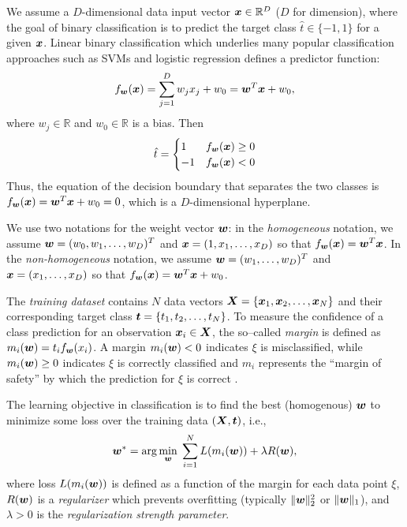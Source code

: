 \ENDMYCOMMENT

We assume a $D$-dimensional data input vector $\boldsymbol{x} \in \mathbb{R}^D$ ($D$ for
dimension), where the goal of binary classification is to predict the
target class $\hat{t} \in \{ -1, 1 \}$ for a given $\boldsymbol{x}$.  Linear
binary classification which underlies many popular classification
approaches such as SVMs and logistic regression defines a predictor
function:
\begin{equation} 
\label{eq:predictor}
f_{\boldsymbol{w}}(\boldsymbol{x}) = \sum_{j=1}^D w_j x_j + w_0 = \boldsymbol{w}^T \boldsymbol{x} + w_0,
\end{equation}
where $w_j \in \mathbb{R}$ and $w_0 \in \mathbb{R}$ is a bias.  Then
\begin{equation}
\hat{t} = 
  \begin{cases}
  1  & f_{\boldsymbol{w}}(\boldsymbol{x}) \geq 0\\
  -1 & f_{\boldsymbol{w}}(\boldsymbol{x}) <    0
  \end{cases}
\end{equation}
Thus, the equation of the decision boundary that separates the two
classes is $f_{\boldsymbol{w}}(\boldsymbol{x}) = \boldsymbol{w}^T \boldsymbol{x} + w_0 = 0$, which is a
$D$-dimensional hyperplane.

We use two notations for the weight vector $\boldsymbol{w}$: in the
\emph{homogeneous} notation, we assume $\boldsymbol{w} = (w_0,w_1,\ldots,w_D)^T$
and $\boldsymbol{x} = (1,x_1,\ldots,x_D)$ so that $f_{\boldsymbol{w}}(\boldsymbol{x}) = \boldsymbol{w}^T \boldsymbol{x}$.  In the
\emph{non-homogeneous} notation, we assume $\boldsymbol{w} = (w_1,\ldots,w_D)^T$
and $\boldsymbol{x} = (x_1,\ldots,x_D)$ so that $f_{\boldsymbol{w}}(\boldsymbol{x}) = \boldsymbol{w}^T \boldsymbol{x} + w_0$.

The \emph{training dataset} contains $N$ data vectors $\boldsymbol{X} =
\{\boldsymbol{x}_1, \boldsymbol{x}_2, \dots, \boldsymbol{x}_N\}$ and their corresponding target
class $\boldsymbol{t} = \{t_1, t_2, \dots, t_N\}$. To measure the confidence of a
class prediction for an observation $\boldsymbol{x}_i \in \boldsymbol{X}$, the so--called
\emph{margin} is defined as $m_i(\boldsymbol{w}) = t_i f_{\boldsymbol{w}}(x_i)$.  A margin
$m_i(\boldsymbol{w}) < 0$ indicates $\xi$ is misclassified, while $m_i(\boldsymbol{w}) \geq 0$
indicates $\xi$ is correctly classified and $m_i$ represents the
``margin of safety'' by which the prediction for $\xi$ is correct
\cite{McAllester}.

The learning objective in classification is to find the best
(homogenous) $\boldsymbol{w}$ to minimize some loss over the training data
$(\boldsymbol{X},\boldsymbol{t})$, i.e.,
\begin{equation}
\label{eq:objective}
 \boldsymbol{w}^* = \arg\min_{\boldsymbol{w}} \; \sum_{i=1}^{N} L(m_i(\boldsymbol{w})) + \lambda R(\boldsymbol{w}),
\end{equation}
where loss $L(m_i(\boldsymbol{w}))$ is defined as a function of the margin for
each data point $\xi$, $R(\boldsymbol{w})$ is a \emph{regularizer} which
prevents overfitting (typically $\|\boldsymbol{w}\|_2^2$ or $\|\boldsymbol{w}\|_1$), and
$\lambda > 0$ is the \emph{regularization strength parameter}.


